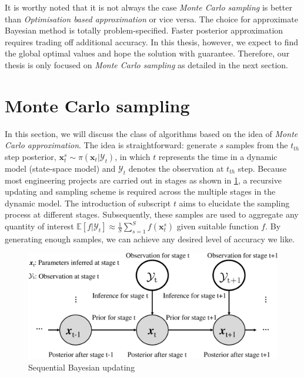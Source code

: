 It is worthy noted that it is not always the case \textit{Monte Carlo sampling} is better than \textit{Optimisation based approximation} or vice versa. The choice for approximate Bayesian method is totally problem-specified. Faster posterior approximation requires trading off additional accuracy. In this thesis, however, we expect to find the global optimal values and hope the solution with guarantee. Therefore, our thesis is only focused on \textit{Monte Carlo sampling} as detailed in the next section.

\section{Monte Carlo sampling}
In this section, we will discuss the class of algorithms based on the idea of \textit{Monte Carlo approximation}. The idea is straightforward: generate $s$ samples from the $t_{th}$ step posterior, $\boldsymbol{x}_{t}^{s} \sim  \pi(\boldsymbol{x}_{t}|\mathcal{Y}_{t})$, in which $t$ represents the time in a dynamic model (state-space model) and $\mathcal{Y}_{t}$ denotes the observation at $t_{th}$ step. Because most engineering projects are carried out in stages as shown in \cref{fig: Sequential Bayesian}, a recursive updating and sampling scheme is required across the multiple stages in the dynamic model. The introduction of subscript $t$ aims to elucidate the sampling process at different stages. Subsequently, these samples are used to aggregate any quantity of interest $\mathbb{E}[ f|\mathcal{Y}_{t}] \approx \frac{1}{S} \sum_{s=1}^{S}f(\boldsymbol{x}_{t}^{s})$ given suitable function $f$. By generating enough samples, we can achieve any desired level of accuracy we like.
\begin{figure}[htbp]
    \centering
    \includegraphics[width = 140mm]{Figures/figures-Sequential_Bayesian.pdf}
    \caption{Sequential Bayesian updating}
    \label{fig: Sequential Bayesian}
\end{figure}

